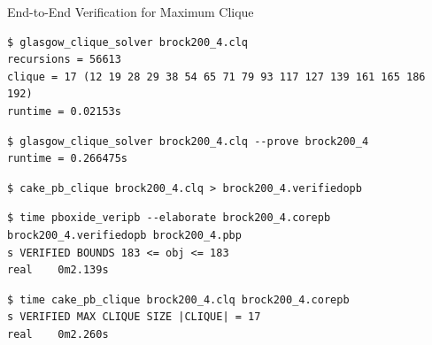 \documentclass[aspectratio=169,compress,10pt]{beamer}
\begin{document}
\begin{frame}[fragile,t]{End-to-End Verification for Maximum Clique}\vspace*{-0.3cm}
\begin{Verbatim}[fontsize=\scriptsize]
$ glasgow_clique_solver brock200_4.clq
recursions = 56613
clique = 17 (12 19 28 29 38 54 65 71 79 93 117 127 139 161 165 186 192)
runtime = 0.02153s
\end{Verbatim}
\smallskip
\begin{Verbatim}[fontsize=\scriptsize]
$ glasgow_clique_solver brock200_4.clq --prove brock200_4
runtime = 0.266475s
\end{Verbatim}
\smallskip
\begin{Verbatim}[fontsize=\scriptsize]
$ cake_pb_clique brock200_4.clq > brock200_4.verifiedopb
\end{Verbatim}
\smallskip
\begin{Verbatim}[fontsize=\scriptsize]
$ time pboxide_veripb --elaborate brock200_4.corepb brock200_4.verifiedopb brock200_4.pbp
s VERIFIED BOUNDS 183 <= obj <= 183
real    0m2.139s
\end{Verbatim}
\smallskip
\begin{Verbatim}[fontsize=\scriptsize]
$ time cake_pb_clique brock200_4.clq brock200_4.corepb
s VERIFIED MAX CLIQUE SIZE |CLIQUE| = 17
real    0m2.260s
\end{Verbatim}
\end{frame}
\end{document}
